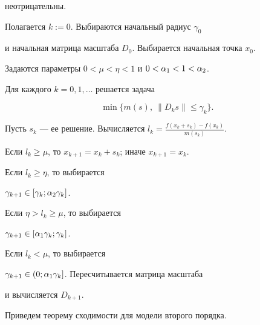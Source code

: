 неотрицательны.





Полагается $k:=0$. Выбираются начальный радиус $\gamma_0$


и начальная матрица масштаба $D_0$. Выбирается начальная точка $x_0$.


Задаются параметры $0 < \mu < \eta < 1$ и $0 < \alpha_1 < 1 < \alpha_2$.





Для каждого $k=0,1,\dotsc$ решается задача


$$


\min\{ m(s), \ \|D_k s\| \leq \gamma_k\}.


$$


Пусть $s_k$ --- ее решение. Вычисляется $l_k=\frac{f(x_k+s_k)-f(x_k)}{m(s_k)}$.





Если $l_k \geq \mu$, то $x_{k+1}=x_k+s_k$; иначе $x_{k+1}=x_k$.





Если $l_k \geq \eta$, то выбирается


$\gamma_{k+1} \in [\gamma_k; \alpha_2 \gamma_k]$.





Если $\eta >l_k\geq \mu$, то выбирается


$\gamma_{k+1} \in [\alpha_1 \gamma_k; \gamma_k]$.





Если $l_k< \mu$, то выбирается


$\gamma_{k+1} \in (0; \alpha_1 \gamma_k]$. Пересчитывается матрица масштаба


и вычисляется $D_{k+1}$.





Приведем теорему сходимости для модели второго порядка.





